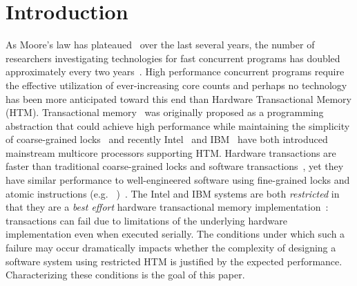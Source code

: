 \section{Introduction}


As Moore's law has plateaued~\cite{Vardi14} over the
last several years, the number of researchers investigating 
technologies for fast concurrent programs has doubled 
approximately every two years~\cite{ACM}.  High performance
concurrent programs require the effective utilization of 
ever-increasing core counts and perhaps no technology
has been more anticipated toward this end than Hardware 
Transactional Memory (HTM).  
Transactional memory~\cite{HerlihyMo93} was originally
proposed as a programming abstraction that could achieve
high performance while maintaining the simplicity of 
coarse-grained locks~\cite{YooHuLa13} and recently 
Intel~\cite{Reinders12,IntelISAX12} and
IBM~\cite{CainMiFr13,Merritt11,IBMPower8Overview14} have both
introduced mainstream multicore processors 
supporting  HTM.  
Hardware transactions are faster than traditional
coarse-grained locks and software
transactions~\cite{YooHuLa13,CascavalBlMi08}, 
yet they have similar
performance to well-engineered software using fine-grained 
locks and atomic instructions (e.g.
~\cite{Herlihy91})~\cite{YooHuLa13}. 
The Intel and IBM
systems are both \emph{restricted} in that they are 
a \emph{best effort} hardware transactional memory
implementation~\cite{Roman12,IntelISAX12,CainMiFr13,IBMPower8Optimization14}:
transactions can fail due to limitations
of the underlying hardware implementation even when 
executed serially.  The conditions
under which such a failure may occur dramatically impacts
whether the complexity of designing a software 
system using restricted HTM
is justified by the expected performance.  Characterizing
these conditions is the goal of this paper. 

